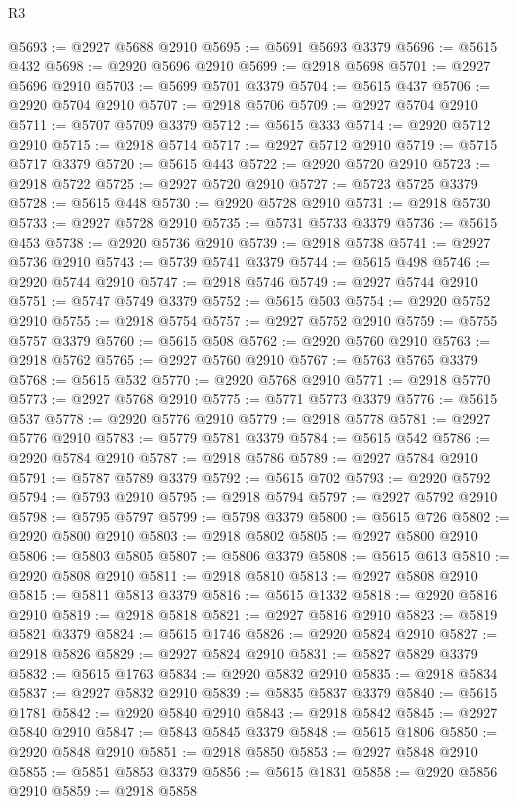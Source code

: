 \begin{lexlean}{R3}
\begin{coremodule}
@5693 := @2927 @5688 @2910
@5695 := @5691 @5693 @3379
@5696 := @5615 @432
@5698 := @2920 @5696 @2910
@5699 := @2918 @5698
@5701 := @2927 @5696 @2910
@5703 := @5699 @5701 @3379
@5704 := @5615 @437
@5706 := @2920 @5704 @2910
@5707 := @2918 @5706
@5709 := @2927 @5704 @2910
@5711 := @5707 @5709 @3379
@5712 := @5615 @333
@5714 := @2920 @5712 @2910
@5715 := @2918 @5714
@5717 := @2927 @5712 @2910
@5719 := @5715 @5717 @3379
@5720 := @5615 @443
@5722 := @2920 @5720 @2910
@5723 := @2918 @5722
@5725 := @2927 @5720 @2910
@5727 := @5723 @5725 @3379
@5728 := @5615 @448
@5730 := @2920 @5728 @2910
@5731 := @2918 @5730
@5733 := @2927 @5728 @2910
@5735 := @5731 @5733 @3379
@5736 := @5615 @453
@5738 := @2920 @5736 @2910
@5739 := @2918 @5738
@5741 := @2927 @5736 @2910
@5743 := @5739 @5741 @3379
@5744 := @5615 @498
@5746 := @2920 @5744 @2910
@5747 := @2918 @5746
@5749 := @2927 @5744 @2910
@5751 := @5747 @5749 @3379
@5752 := @5615 @503
@5754 := @2920 @5752 @2910
@5755 := @2918 @5754
@5757 := @2927 @5752 @2910
@5759 := @5755 @5757 @3379
@5760 := @5615 @508
@5762 := @2920 @5760 @2910
@5763 := @2918 @5762
@5765 := @2927 @5760 @2910
@5767 := @5763 @5765 @3379
@5768 := @5615 @532
@5770 := @2920 @5768 @2910
@5771 := @2918 @5770
@5773 := @2927 @5768 @2910
@5775 := @5771 @5773 @3379
@5776 := @5615 @537
@5778 := @2920 @5776 @2910
@5779 := @2918 @5778
@5781 := @2927 @5776 @2910
@5783 := @5779 @5781 @3379
@5784 := @5615 @542
@5786 := @2920 @5784 @2910
@5787 := @2918 @5786
@5789 := @2927 @5784 @2910
@5791 := @5787 @5789 @3379
@5792 := @5615 @702
@5793 := @2920 @5792
@5794 := @5793 @2910
@5795 := @2918 @5794
@5797 := @2927 @5792 @2910
@5798 := @5795 @5797
@5799 := @5798 @3379
@5800 := @5615 @726
@5802 := @2920 @5800 @2910
@5803 := @2918 @5802
@5805 := @2927 @5800 @2910
@5806 := @5803 @5805
@5807 := @5806 @3379
@5808 := @5615 @613
@5810 := @2920 @5808 @2910
@5811 := @2918 @5810
@5813 := @2927 @5808 @2910
@5815 := @5811 @5813 @3379
@5816 := @5615 @1332
@5818 := @2920 @5816 @2910
@5819 := @2918 @5818
@5821 := @2927 @5816 @2910
@5823 := @5819 @5821 @3379
@5824 := @5615 @1746
@5826 := @2920 @5824 @2910
@5827 := @2918 @5826
@5829 := @2927 @5824 @2910
@5831 := @5827 @5829 @3379
@5832 := @5615 @1763
@5834 := @2920 @5832 @2910
@5835 := @2918 @5834
@5837 := @2927 @5832 @2910
@5839 := @5835 @5837 @3379
@5840 := @5615 @1781
@5842 := @2920 @5840 @2910
@5843 := @2918 @5842
@5845 := @2927 @5840 @2910
@5847 := @5843 @5845 @3379
@5848 := @5615 @1806
@5850 := @2920 @5848 @2910
@5851 := @2918 @5850
@5853 := @2927 @5848 @2910
@5855 := @5851 @5853 @3379
@5856 := @5615 @1831
@5858 := @2920 @5856 @2910
@5859 := @2918 @5858

\end{coremodule}
\end{lexlean}
